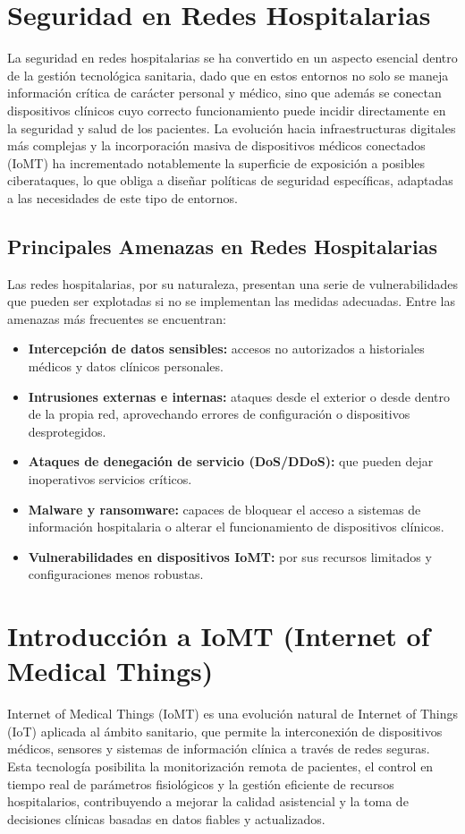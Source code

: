 \section{Seguridad en Redes Hospitalarias}
La seguridad en redes hospitalarias se ha convertido en un aspecto esencial dentro de la gestión tecnológica sanitaria, dado que en estos entornos no solo se maneja información 
crítica de carácter personal y médico, sino que además se conectan dispositivos clínicos cuyo correcto funcionamiento puede incidir directamente en la seguridad y salud de 
los pacientes. La evolución hacia infraestructuras digitales más complejas y la incorporación masiva de dispositivos médicos conectados (IoMT) ha incrementado notablemente 
la superficie de exposición a posibles ciberataques, lo que obliga a diseñar políticas de seguridad específicas, adaptadas a las necesidades de este tipo de entornos.

\subsection{Principales Amenazas en Redes Hospitalarias}
Las redes hospitalarias, por su naturaleza, presentan una serie de vulnerabilidades que pueden ser explotadas si no se implementan las medidas adecuadas. Entre las amenazas 
más frecuentes se encuentran:
\begin{itemize}
    \item \textbf{Intercepción de datos sensibles:} accesos no autorizados a historiales médicos y datos clínicos personales.
    \item \textbf{Intrusiones externas e internas:} ataques desde el exterior o desde dentro de la propia red, aprovechando errores de configuración o dispositivos desprotegidos.
    \item \textbf{Ataques de denegación de servicio (DoS/DDoS):} que pueden dejar inoperativos servicios críticos.
    \item \textbf{Malware y ransomware:} capaces de bloquear el acceso a sistemas de información hospitalaria o alterar el funcionamiento de dispositivos clínicos.
    \item \textbf{Vulnerabilidades en dispositivos IoMT:} por sus recursos limitados y configuraciones menos robustas.
\end{itemize}

\section{Introducción a IoMT (Internet of Medical Things)}
Internet of Medical Things (IoMT) es una evolución natural de Internet of Things (IoT) aplicada al ámbito sanitario, que permite la interconexión de dispositivos médicos, 
sensores y sistemas de información clínica a través de redes seguras. Esta tecnología posibilita la monitorización remota de pacientes, el control en tiempo real de 
parámetros fisiológicos y la gestión eficiente de recursos hospitalarios, contribuyendo a mejorar la calidad asistencial y la toma de decisiones clínicas basadas en datos 
fiables y actualizados. \\

